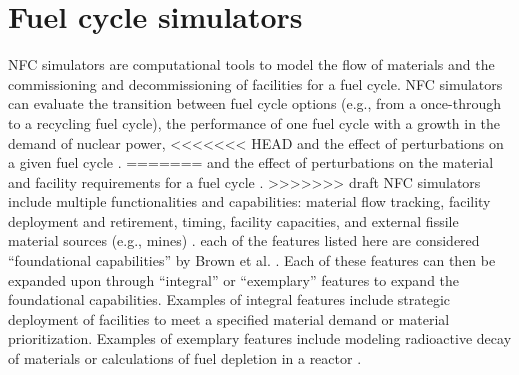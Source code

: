 \section{Fuel cycle simulators}
\gls{NFC} simulators are computational tools to model the flow of materials
and the commissioning and decommissioning of facilities for a fuel 
cycle. \gls{NFC} simulators can evaluate the transition between fuel cycle 
options (e.g., from a once-through to a recycling fuel cycle), the 
performance of one fuel cycle with a growth in the demand of nuclear power, 
<<<<<<< HEAD
and the effect of perturbations on a given fuel cycle \cite{piet_dynamic_2011}. 
=======
and the effect of perturbations on the material and facility 
requirements for a fuel cycle \cite{piet_dynamic_2011}. 
>>>>>>> draft
\gls{NFC} simulators include multiple functionalities and 
capabilities: material flow tracking, facility deployment and 
retirement, timing, facility capacities, and external fissile material 
sources (e.g., mines) \cite{brown_identification_2016}.
each of the features listed here are considered ``foundational 
capabilities'' by Brown et al. 
\cite{brown_identification_2016}. Each of these features can then be 
expanded upon through ``integral'' or ``exemplary'' features to expand the 
foundational capabilities. Examples of integral
features include strategic deployment of facilities to meet a specified 
material demand or material prioritization. Examples of exemplary
features include modeling radioactive decay of materials or calculations 
of fuel depletion in a reactor \cite{brown_identification_2016}. 

